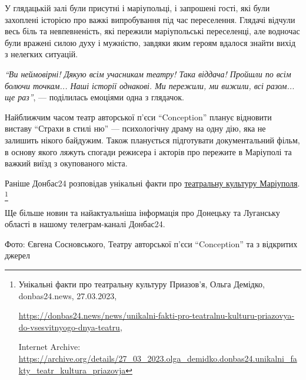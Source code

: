 
У глядацькій залі були присутні і маріупольці, і запрошені гості, які були
захоплені історією про важкі випробування під час переселення. Глядачі відчули
весь біль та невпевненість, які пережили маріупольські переселенці, але
водночас були вражені силою духу і мужністю, завдяки яким героям вдалося знайти
вихід з нелегких ситуацій.


\begin{leftbar}
\emph{\enquote{Ви неймовірні! Дякую всім учасникам театру! Така віддача! Пройшли по всім
болючи точкам... Наші історії однакові. Ми пережили, ми вижили, всі
разом... ще раз}}, — поділилась емоціями одна з глядачок. 
\end{leftbar}


Найближчим часом театр авторської п'єси \enquote{Conception} планує відновити виставу
\enquote{Страхи в стилі ню} — психологічну драму на одну дію, яка не залишить нікого
байдужим. Також планується підготувати документальний фільм, в основу якого
ляжуть спогади режисера і акторів про пережите в Маріуполі та важкий виїзд з
окупованого міста.

Раніше Донбас24 розповідав унікальні факти про \href{https://archive.org/details/27_03_2023.olga_demidko.donbas24.unikalni_fakty_teatr_kultura_priazovja}{театральну культуру Маріуполя}.%
\footnote{Унікальні факти про театральну культуру Приазов'я, Ольга Демідко, donbas24.news, 27.03.2023, %
\par\url{https://donbas24.news/news/unikalni-fakti-pro-teatralnu-kulturu-priazovya-do-vsesvitnyogo-dnya-teatru}, \par%
Internet Archive: \url{https://archive.org/details/27_03_2023.olga_demidko.donbas24.unikalni_fakty_teatr_kultura_priazovja}%
}

Ще більше новин та найактуальніша інформація про Донецьку та Луганську області
в нашому телеграм-каналі Донбас24.

Фото: Євгена Сосновського, Театру авторської п'єси \enquote{Conception} та з відкритих
джерел


